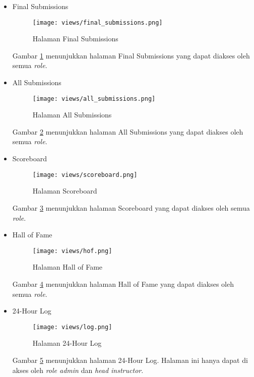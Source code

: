 \begin{itemize}
      \item Final Submissions
            \begin{figure}[H]
                  \centering
                  \texttt{[image: views/final\_submissions.png]}
                  \caption{Halaman Final Submissions}
                  \label{fig:3:1:1:final}
            \end{figure}

            Gambar \ref{fig:3:1:1:final} menunjukkan halaman Final Submissions yang dapat diakses oleh semua \textit{role}.

      \item All Submissions
            \begin{figure}[H]
                  \centering
                  \texttt{[image: views/all\_submissions.png]}
                  \caption{Halaman All Submissions}
                  \label{fig:3:1:1:all}
            \end{figure}

            Gambar \ref{fig:3:1:1:all} menunjukkan halaman All Submissions yang dapat diakses oleh semua \textit{role}.
      \item Scoreboard
            \begin{figure}[H]
                  \centering
                  \texttt{[image: views/scoreboard.png]}
                  \caption{Halaman Scoreboard}
                  \label{fig:3:1:1:scoreboard}
            \end{figure}

            Gambar \ref{fig:3:1:1:scoreboard} menunjukkan halaman Scoreboard yang dapat diakses oleh semua \textit{role}.

      \item Hall of Fame
            \begin{figure}[H]
                  \centering
                  \texttt{[image: views/hof.png]}
                  \caption{Halaman Hall of Fame}
                  \label{fig:3:1:1:hof}
            \end{figure}

            Gambar \ref{fig:3:1:1:hof} menunjukkan halaman Hall of Fame yang dapat diakses oleh semua \textit{role}.

      \item 24-Hour Log
            \begin{figure}[H]
                  \centering
                  \texttt{[image: views/log.png]}
                  \caption{Halaman 24-Hour Log}
                  \label{fig:3:1:1:log}
            \end{figure}

            Gambar \ref{fig:3:1:1:log} menunjukkan halaman 24-Hour Log. Halaman ini hanya dapat di akses oleh \textit{role admin} dan \textit{head instructor}.

\end{itemize}

